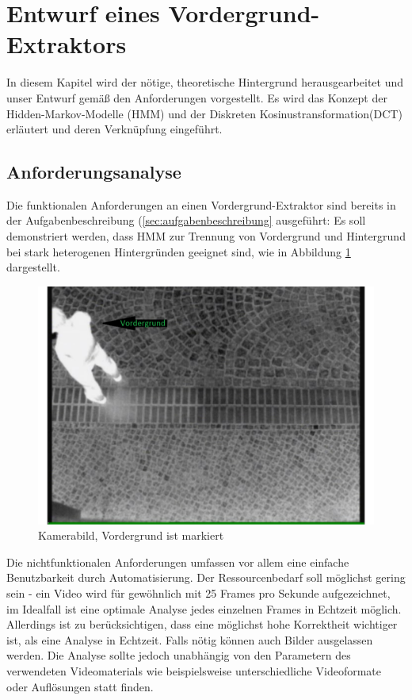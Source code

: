 \section{Entwurf eines Vordergrund-Extraktors}
\label{chap:entwurf}

In diesem Kapitel wird der nötige, theoretische Hintergrund herausgearbeitet und unser Entwurf gemäß den Anforderungen vorgestellt.
Es wird das Konzept der Hidden-Markov-Modelle (HMM) und der Diskreten Kosinustransformation(DCT) erläutert und deren Verknüpfung eingeführt.


\subsection{Anforderungsanalyse}
\label{sec:anforderungsanalyse}

Die funktionalen Anforderungen an einen Vordergrund-Extraktor sind bereits in der Aufgabenbeschreibung (\ref{sec:aufgabenbeschreibung} ausgeführt:
Es soll demonstriert werden, dass HMM zur Trennung von Vordergrund und Hintergrund bei stark heterogenen Hintergründen geeignet sind, wie in Abbildung \ref{fig:foreground} dargestellt.
\begin{figure}[H]
	\centering
	\includegraphics[width=1\textwidth]{bilder/01_foreground.pdf}
	\caption{Kamerabild, Vordergrund ist markiert}
	\label{fig:foreground}
\end{figure}
Die nichtfunktionalen Anforderungen umfassen vor allem eine einfache Benutzbarkeit durch Automatisierung.
Der Ressourcenbedarf soll möglichst gering sein - ein Video wird für gewöhnlich mit 25 Frames pro Sekunde aufgezeichnet, im Idealfall ist eine optimale Analyse jedes einzelnen Frames in Echtzeit möglich.
Allerdings ist zu berücksichtigen, dass eine möglichst hohe Korrektheit wichtiger ist, als eine Analyse in Echtzeit. Falls nötig können auch Bilder ausgelassen werden.
Die Analyse sollte jedoch unabhängig von den Parametern des verwendeten Videomaterials wie beispielsweise unterschiedliche Videoformate oder Auflösungen statt finden.


